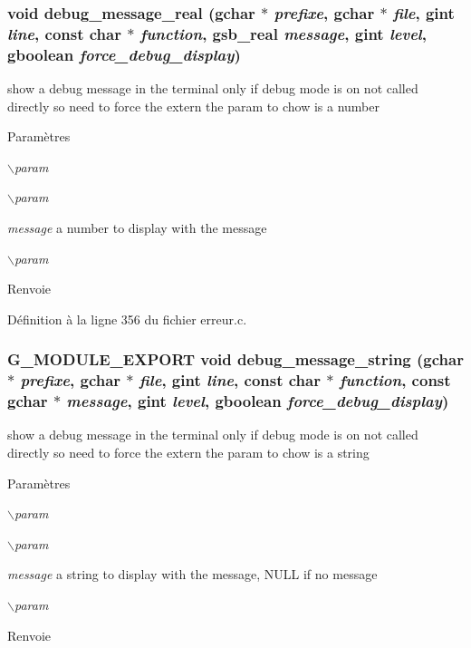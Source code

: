 \subsubsection[{debug\_\-message\_\-real}]{\setlength{\rightskip}{0pt plus 5cm}void debug\_\-message\_\-real (gchar $\ast$ {\em prefixe}, \/  gchar $\ast$ {\em file}, \/  gint {\em line}, \/  const char $\ast$ {\em function}, \/  {\bf gsb\_\-real} {\em message}, \/  gint {\em level}, \/  gboolean {\em force\_\-debug\_\-display})}\label{erreur_8c_a1d5e8e58666af6134f40c6b2469749fe}
show a debug message in the terminal only if debug mode is on not called directly so need to force the extern the param to chow is a number


\begin{DoxyParams}{Paramètres}
\item[{\em $\backslash$param}]\item[{\em $\backslash$param}]\item[{\em message}]a number to display with the message \item[{\em $\backslash$param}]\end{DoxyParams}
\begin{DoxyReturn}{Renvoie}

\end{DoxyReturn}


Définition à la ligne 356 du fichier erreur.c.

\subsubsection[{debug\_\-message\_\-string}]{\setlength{\rightskip}{0pt plus 5cm}G\_\-MODULE\_\-EXPORT void debug\_\-message\_\-string (gchar $\ast$ {\em prefixe}, \/  gchar $\ast$ {\em file}, \/  gint {\em line}, \/  const char $\ast$ {\em function}, \/  const gchar $\ast$ {\em message}, \/  gint {\em level}, \/  gboolean {\em force\_\-debug\_\-display})}\label{erreur_8c_a610481ee224a2ea98c37456084c54638}
show a debug message in the terminal only if debug mode is on not called directly so need to force the extern the param to chow is a string


\begin{DoxyParams}{Paramètres}
\item[{\em $\backslash$param}]\item[{\em $\backslash$param}]\item[{\em message}]a string to display with the message, NULL if no message \item[{\em $\backslash$param}]\end{DoxyParams}
\begin{DoxyReturn}{Renvoie}

\end{DoxyReturn}


